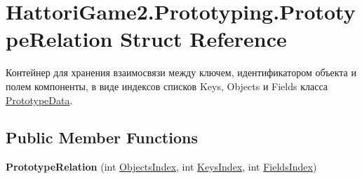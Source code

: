 \hypertarget{struct_hattori_game2_1_1_prototyping_1_1_prototype_relation}{}\section{Hattori\+Game2.\+Prototyping.\+Prototype\+Relation Struct Reference}
\label{struct_hattori_game2_1_1_prototyping_1_1_prototype_relation}


Контейнер для хранения взаимосвязи между ключем, идентификатором объекта и полем компоненты, в виде индексов списков {\ttfamily Keys}, {\ttfamily Objects} и {\ttfamily Fields} класса \hyperlink{class_hattori_game2_1_1_prototyping_1_1_prototype_data}{Prototype\+Data}.  


\subsection*{Public Member Functions}
\begin{DoxyCompactItemize}
\item 
\hypertarget{struct_hattori_game2_1_1_prototyping_1_1_prototype_relation_ab5e0243b22ce03d68a991169654b5a0b}{}{\bfseries Prototype\+Relation} (int \hyperlink{struct_hattori_game2_1_1_prototyping_1_1_prototype_relation_a7f0eab82b565c07fe25369f2257da5e7_a7f0eab82b565c07fe25369f2257da5e7}{Objects\+Index}, int \hyperlink{struct_hattori_game2_1_1_prototyping_1_1_prototype_relation_a27933617bc39d11099af269e754f0411_a27933617bc39d11099af269e754f0411}{Keys\+Index}, int \hyperlink{struct_hattori_game2_1_1_prototyping_1_1_prototype_relation_a88f609574124005e5fc15ce6f1e370d7_a88f609574124005e5fc15ce6f1e370d7}{Fields\+Index})\label{struct_hattori_game2_1_1_prototyping_1_1_prototype_relation_ab5e0243b22ce03d68a991169654b5a0b}

\end{DoxyCompactItemize}
